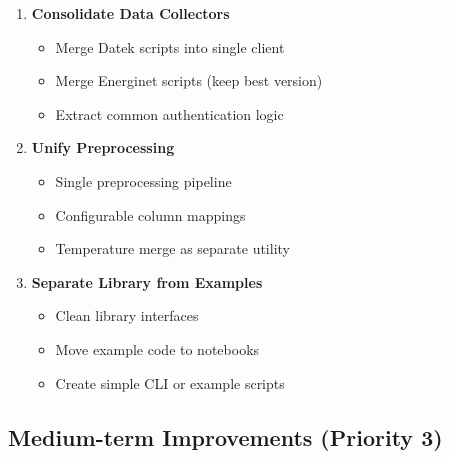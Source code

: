 \documentclass[11pt,a4paper]{article}
\begin{document}
\begin{enumerate}
    \item \textbf{Consolidate Data Collectors}
    \begin{itemize}
        \item Merge Datek scripts into single client
        \item Merge Energinet scripts (keep best version)
        \item Extract common authentication logic
    \end{itemize}
    
    \item \textbf{Unify Preprocessing}
    \begin{itemize}
        \item Single preprocessing pipeline
        \item Configurable column mappings
        \item Temperature merge as separate utility
    \end{itemize}
    
    \item \textbf{Separate Library from Examples}
    \begin{itemize}
        \item Clean library interfaces
        \item Move example code to notebooks
        \item Create simple CLI or example scripts
    \end{itemize}
\end{enumerate}

\subsection{Medium-term Improvements (Priority 3)}
\end{document}

